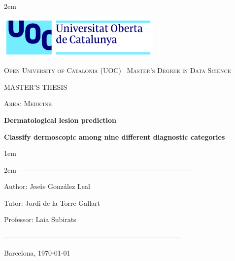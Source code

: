 \newpage
\thispagestyle{empty}

\baselineskip 2em


\centerline{\includegraphics[width=0.6\textwidth]{images/UOC-logo}}
\begin{center}
\textsc{Open University of Catalonia (UOC) \
Master's Degree in Data Science \
}


\vspace*{1.5cm}

\textsc{\Large MASTER'S THESIS}

\vspace*{0.5cm}

\textsc{\large Area: Medicine}


\vspace*{2.0cm}

\textbf{\Large Dermatological lesion prediction}

\textbf{\large Classify dermoscopic among nine different diagnostic categories}

\vspace{2.5cm}
\baselineskip 1em

\baselineskip 2em
-----------------------------------------------------------------------------\

Author: Jesús González Leal\

Tutor: Jordi de la Torre Gallart\

Professor: Laia Subirats\

-----------------------------------------------------------------------------\

\vspace*{1.5cm}
Barcelona, \today

\end{center}

\newpage
\pagestyle{empty}
\hfill